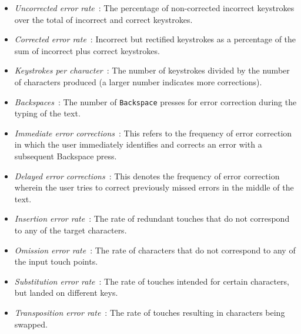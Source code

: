\begin{itemize}
    \item \textit{Uncorrected error rate}~\cite{wobbrock2007measures}: The percentage of non-corrected incorrect keystrokes over the total of incorrect and correct keystrokes.
    \item \textit{Corrected error rate}~\cite{wobbrock2007measures}: Incorrect but rectified keystrokes as a percentage of the  sum of incorrect plus correct keystrokes.
    \item \textit{Keystrokes per character}~\cite{wobbrock2007measures}: The number of keystrokes divided by the number of characters produced (a larger number indicates more corrections).
    \item \textit{Backspaces}~\cite{palin2019people}: The number of \texttt{Backspace} presses for error correction during the typing of the text.
    \item \textit{Immediate error corrections}~\cite{arif2016evaluation}: This refers to the frequency of error correction in which the user immediately identifies and corrects an error with a subsequent Backspace press.
    \item \textit{Delayed error corrections}~\cite{arif2016evaluation}: This denotes the frequency of error correction wherein the user tries to correct previously missed errors in the middle of the text.
    \item \textit{Insertion error rate}~\cite{wang2021facilitating}: The rate of redundant touches that do not correspond to any of the target characters.
    \item \textit{Omission error rate}~\cite{wang2021facilitating}:  The rate of characters that do not correspond to any of the input touch points.
    \item \textit{Substitution error rate}~\cite{wang2021facilitating}: The rate of touches intended for certain characters, but landed on different keys.
    \item \textit{Transposition error rate}~\cite{wang2021facilitating}: The rate of touches resulting in characters being swapped.
\end{itemize}